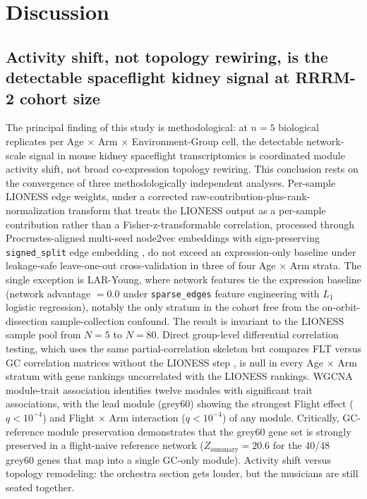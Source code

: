 \documentclass[11pt]{article}
\newcommand{\code}[1]{\texttt{#1}}
\newcommand{\pkg}[1]{\textsf{#1}}
\begin{document}
\section{Discussion}

\subsection{Activity shift, not topology rewiring, is the detectable spaceflight kidney signal at RRRM-2 cohort size}

The principal finding of this study is methodological: at $n{=}5$ biological replicates per Age $\times$ Arm $\times$ Environment-Group cell, the detectable network-scale signal in mouse kidney spaceflight transcriptomics is coordinated module activity shift, not broad co-expression topology rewiring. This conclusion rests on the convergence of three methodologically independent analyses. Per-sample LIONESS edge weights, under a corrected raw-contribution-plus-rank-normalization transform that treats the LIONESS output as a per-sample contribution rather than a Fisher-z-transformable correlation, processed through Procrustes-aligned multi-seed \pkg{node2vec} embeddings with sign-preserving \code{signed\_split} edge embedding \citep{kuijjer2019estimating, grover2016node2vec, liu2021pecanpy}, do not exceed an expression-only baseline under leakage-safe leave-one-out cross-validation in three of four Age $\times$ Arm strata. The single exception is LAR-Young, where network features tie the expression baseline (network advantage $=0.0$ under \code{sparse\_edges} feature engineering with $L_1$ logistic regression), notably the only stratum in the cohort free from the on-orbit-dissection sample-collection confound. The result is invariant to the LIONESS sample pool from $N{=}5$ to $N{=}80$. Direct group-level differential correlation testing, which uses the same partial-correlation skeleton but compares FLT versus GC correlation matrices without the LIONESS step \citep{tesson2010diffcoex}, is null in every Age $\times$ Arm stratum with gene rankings uncorrelated with the LIONESS rankings. WGCNA module-trait association \citep{langfelder2008wgcna} identifies twelve modules with significant trait associations, with the lead module (grey60) showing the strongest Flight effect ($q < 10^{-4}$) and Flight $\times$ Arm interaction ($q < 10^{-4}$) of any module. Critically, GC-reference module preservation \citep{langfelder2011module} demonstrates that the grey60 gene set is strongly preserved in a flight-naive reference network ($Z_{\text{summary}} = 20.6$ for the 40/48 grey60 genes that map into a single GC-only module). Activity shift versus topology remodeling: the orchestra section gets louder, but the musicians are still seated together.
\end{document}
